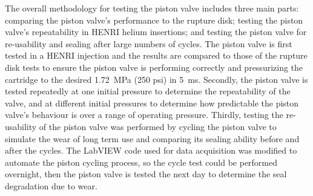 
The overall methodology for testing the piston valve includes three main parts: comparing the piston valve's performance to the rupture disk; testing the piston valve's repeatability in HENRI helium insertions; and testing the piston valve for re-usability and sealing after large numbers of cycles. The piston valve is first tested in a HENRI injection and the results are compared to those of the rupture disk tests to ensure the piston valve is performing correctly and pressurizing the cartridge to the desired \SI{1.72}{\mega\pascal} (250 psi) in \SI{5}{\milli\second}. Secondly, the piston valve is tested repeatedly at one initial pressure to determine the repeatability of the valve, and at different initial pressures to determine how predictable the piston valve's behaviour is over a range of operating pressure. Thirdly, testing the re-usability of the piston valve was performed by cycling the piston valve to simulate the wear of long term use and comparing its sealing ability before and after the cycles. The LabVIEW code used for data acquisition was modified to automate the piston cycling process, so the cycle test could be performed overnight, then the piston valve is tested the next day to determine the seal degradation due to wear.
